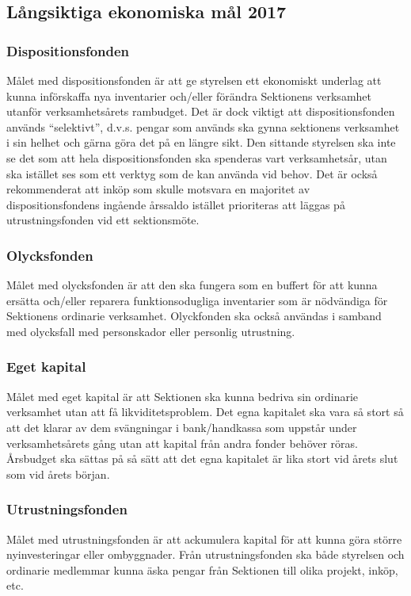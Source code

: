 \documentclass[../_main/handlingar.tex]{subfiles}
\begin{document}
\newpage
\subsection*{Långsiktiga ekonomiska mål 2017}

\subsubsection*{Dispositionsfonden}
Målet med dispositionsfonden är att ge styrelsen ett ekonomiskt underlag att kunna införskaffa nya inventarier och/eller förändra Sektionens verksamhet utanför verksamhetsårets rambudget. Det är dock viktigt att dispositionsfonden används “selektivt”, d.v.s. pengar som används ska gynna sektionens verksamhet i sin helhet och gärna göra det på en längre sikt. Den sittande styrelsen ska inte se det som att hela dispositionsfonden ska spenderas vart verksamhetsår, utan ska istället ses som ett verktyg som de kan använda vid behov. Det är också rekommenderat att inköp som skulle motsvara en majoritet av dispositionsfondens ingående årssaldo istället prioriteras att läggas på utrustningsfonden vid ett sektionsmöte.

\subsubsection*{Olycksfonden}
Målet med olycksfonden är att den ska fungera som en buffert för att kunna ersätta och/eller reparera funktionsodugliga inventarier som är nödvändiga för Sektionens ordinarie verksamhet.  Olyckfonden ska också användas i samband med olycksfall med personskador eller personlig utrustning.

\subsubsection*{Eget kapital}
Målet med eget kapital är att Sektionen ska kunna bedriva sin ordinarie verksamhet utan att få likviditetsproblem. Det egna kapitalet ska vara så stort så att det klarar av dem svängningar i bank/handkassa som uppstår under verksamhetsårets gång utan att kapital från andra fonder behöver röras. Årsbudget ska sättas på så sätt att det egna kapitalet är lika stort vid årets slut som vid årets början.

\subsubsection*{Utrustningsfonden}
Målet med utrustningsfonden är att ackumulera kapital för att kunna göra större nyinvesteringar eller ombyggnader. Från utrustningsfonden ska både styrelsen och ordinarie medlemmar kunna äska pengar från Sektionen till olika projekt, inköp, etc.
\end{document}
